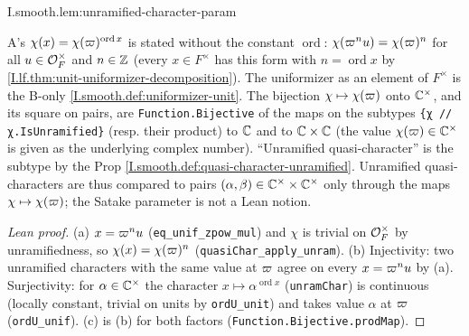 \begin{lemma}
\end{lemma}
\begin{tfformal}{I.smooth.lem:unramified-character-param}
\begin{tffidelity}
A's $\chi(x)=\chi(\varpi)^{\operatorname{ord}x}$ is stated without the constant $\operatorname{ord}$: $\chi(\varpi^n u)=\chi(\varpi)^n$ for all $u\in\mathcal{O}_F^\times$ and $n\in\mathbb{Z}$ (every $x\in F^\times$ has this form with $n=\operatorname{ord}x$ by \cref{I.lf.thm:unit-uniformizer-decomposition}). The uniformizer as an element of $F^\times$ is the B-only \cref{I.smooth.def:uniformizer-unit}. The bijection $\chi\mapsto\chi(\varpi)$ onto $\mathbb{C}^\times$, and its square on pairs, are \texttt{Function.Bijective} of the maps on the subtypes \texttt{\{χ // χ.IsUnramified\}} (resp. their product) to $\mathbb{C}$ and to $\mathbb{C}\times\mathbb{C}$ (the value $\chi(\varpi)\in\mathbb{C}^\times$ is given as the underlying complex number). ``Unramified quasi-character'' is the subtype by the Prop \cref{I.smooth.def:quasi-character-unramified}. Unramified quasi-characters are thus compared to pairs $(\alpha,\beta)\in\mathbb{C}^\times\times\mathbb{C}^\times$ only through the maps $\chi\mapsto\chi(\varpi)$; the Satake parameter is not a Lean notion.
\end{tffidelity}
\end{tfformal}
\begin{proof}[Lean proof]
(a) $x=\varpi^n u$ (\texttt{eq\_unif\_zpow\_mul}) and $\chi$ is trivial on $\mathcal{O}_F^\times$ by unramifiedness, so $\chi(x)=\chi(\varpi)^n$ (\texttt{quasiChar\_apply\_unram}). (b) Injectivity: two unramified characters with the same value at $\varpi$ agree on every $x=\varpi^nu$ by (a). Surjectivity: for $\alpha\in\mathbb{C}^\times$ the character $x\mapsto\alpha^{\operatorname{ord}x}$ (\texttt{unramChar}) is continuous (locally constant, trivial on units by \texttt{ordU\_unit}) and takes value $\alpha$ at $\varpi$ (\texttt{ordU\_unif}). (c) is (b) for both factors (\texttt{Function.Bijective.prodMap}).
\end{proof}

